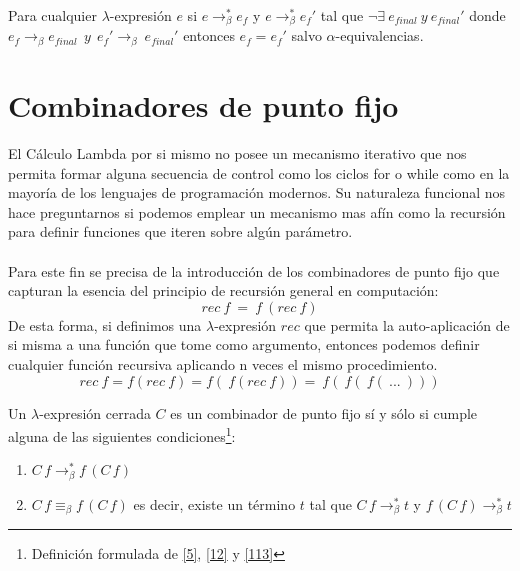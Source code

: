                     \begin{corollary}
Para cualquier $\lambda$-expresión $e$ si $e\to_\beta^*e_f$ y $e\to_\beta^*e_f'$ tal que  $\neg \exists\ e_{final}\ y\ e_{final}'$ donde $e_f \rightarrow_{\beta} e_{final}\ \ y\ \ e_f' \rightarrow_{\beta}\ e_{final}'$
entonces $e_f = e_f'$ salvo $\alpha$-equivalencias. 
                    \end{corollary}

        \section{Combinadores de punto fijo}
                    El Cálculo Lambda por si mismo no posee un mecanismo iterativo que nos permita formar alguna secuencia de control como los ciclos \textsf{for} o \textsf{while} como en la mayoría de los lenguajes de programación modernos. Su naturaleza funcional nos hace preguntarnos si podemos emplear un mecanismo mas afín como la recursión para definir funciones que iteren sobre algún parámetro.\\\\
                   Para este fin se precisa de la introducción de los combinadores de punto fijo que capturan la esencia del principio de recursión general en computación:
                    $$ rec\ f\ =\ f\ (rec\ f) $$
                    De esta forma, si definimos una $\lambda$-expresión $rec$ que permita la auto-aplicación de si misma a una función que tome como argumento, entonces podemos definir cualquier función recursiva aplicando n veces el mismo procedimiento.
                    $$rec\ f = f(rec\ f) = f(\ f(rec\ f)) =\ f(\ f(\ f(\ ...\ )))$$
                    
                    \begin{definition} Un $\lambda$-expresión cerrada $C$ es un combinador de punto fijo sí y sólo si cumple alguna de las siguientes condiciones\footnote{Definición formulada de \hyperlink{5}{[5]}, \hyperlink{12}{[12]} y \hyperlink{113}{[113]}}:
                        \begin{enumerate}
                            \item $C\,f\to_\beta^*f\,(C\,f)$
                            \item $C\,f\equiv_\beta f\,(C\,f)$ es decir, existe un término $t$ tal que $C\,f\to_\beta^*t$ y $f\,(C\,f)\to_\beta^*t$
                        \end{enumerate}
                    \end{definition}

